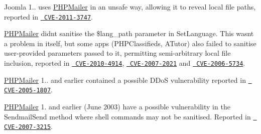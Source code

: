 Joomla 1.. uses \mbox{\hyperlink{namespace_p_h_p_mailer}{PHPMailer}} in an unsafe way, allowing it to reveal local file paths, reported in \href{https://web.nvd.nist.gov/view/vuln/detail?vulnId=CVE-2011-3747}{\texttt{ CVE-\/2011-\/3747}}.

\mbox{\hyperlink{namespace_p_h_p_mailer}{PHPMailer}} didn\textquotesingle{}t sanitise the {\ttfamily \$lang\+\_\+path} parameter in {\ttfamily Set\+Language}. This wasn\textquotesingle{}t a problem in itself, but some apps (PHPClassifieds, ATutor) also failed to sanitise user-\/provided parameters passed to it, permitting semi-\/arbitrary local file inclusion, reported in \href{https://web.nvd.nist.gov/view/vuln/detail?vulnId=CVE-2010-4914}{\texttt{ CVE-\/2010-\/4914}}, \href{https://web.nvd.nist.gov/view/vuln/detail?vulnId=CVE-2007-2021}{\texttt{ CVE-\/2007-\/2021}} and \href{https://web.nvd.nist.gov/view/vuln/detail?vulnId=CVE-2006-5734}{\texttt{ CVE-\/2006-\/5734}}.

\mbox{\hyperlink{namespace_p_h_p_mailer}{PHPMailer}} 1.. and earlier contained a possible DDoS vulnerability reported in \href{https://web.nvd.nist.gov/view/vuln/detail?vulnId=CVE-2005-1807}{\texttt{ CVE-\/2005-\/1807}}.

\mbox{\hyperlink{namespace_p_h_p_mailer}{PHPMailer}} 1. and earlier (June 2003) have a possible vulnerability in the {\ttfamily Sendmail\+Send} method where shell commands may not be sanitised. Reported in \href{https://web.nvd.nist.gov/view/vuln/detail?vulnId=CVE-2007-3215}{\texttt{ CVE-\/2007-\/3215}}. 